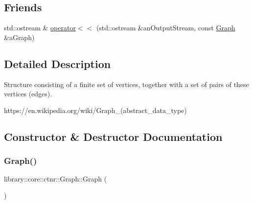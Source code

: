 \subsection*{Friends}
\begin{DoxyCompactItemize}
\item 
std\+::ostream \& \hyperlink{classlibrary_1_1core_1_1ctnr_1_1_graph_a225f9b61ac2385ccf05891298c7ab6b1}{operator$<$$<$} (std\+::ostream \&an\+Output\+Stream, const \hyperlink{classlibrary_1_1core_1_1ctnr_1_1_graph}{Graph} \&a\+Graph)
\end{DoxyCompactItemize}


\subsection{Detailed Description}
Structure consisting of a finite set of vertices, together with a set of pairs of these vertices (edges). 

https\+://en.wikipedia.\+org/wiki/\+Graph\+\_\+(abstract\+\_\+data\+\_\+type) 

\subsection{Constructor \& Destructor Documentation}
\mbox{\label{classlibrary_1_1core_1_1ctnr_1_1_graph_accc4cdce1c3ac23e00d70522857f051d}} 
\subsubsection{\texorpdfstring{Graph()}{Graph()}\hspace{0.1cm}{\footnotesize\ttfamily [1/2]}}
{\footnotesize\ttfamily library\+::core\+::ctnr\+::\+Graph\+::\+Graph (\begin{DoxyParamCaption}{ }\end{DoxyParamCaption})\hspace{0.3cm}{\ttfamily [delete]}}

\mbox{\label{classlibrary_1_1core_1_1ctnr_1_1_graph_aed97aab348693c80c4cd7b4a3cf3c1ba}} 
